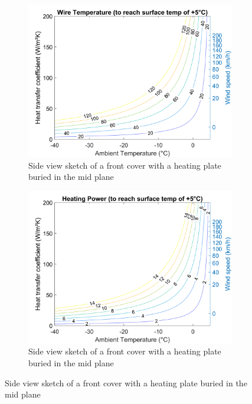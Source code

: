 \begin{figure}[ht]
\centering
\begin{minipage}[b]{0.48\linewidth}
\begin{figure} [H]
	\centering
	\includegraphics[scale=0.45]{Pictures/B1Glass_Tsurf5_WireTemp.png}
	\caption[Front Cover Heat Transfer Model]{Side view sketch of a front cover with a heating plate buried in the mid plane }
	\label{fig:fig1}
\end{figure}

\label{fig:minipage1}
\end{minipage}
\quad
\begin{minipage}[b]{0.48\linewidth}
\begin{figure} [H]
	\centering
	\includegraphics[scale=0.45]{Pictures/B1Glass_Tsurf5_Power.png}
	\caption[Front Cover Heat Transfer Model]{Side view sketch of a front cover with a heating plate buried in the mid plane}
	\label{fig:fig1}
\end{figure}
\label{fig:minipage2}
\end{minipage}
\end{figure}


